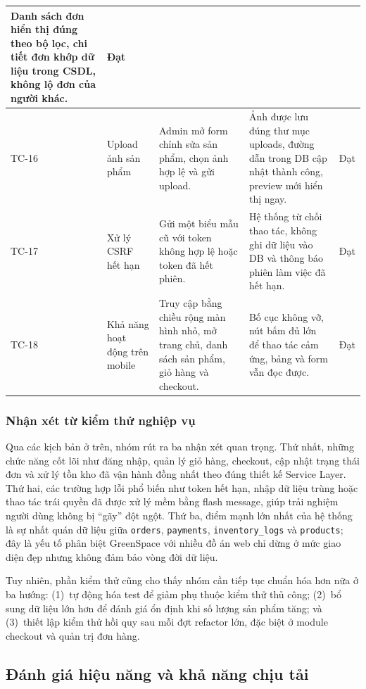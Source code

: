 \documentclass[11pt, a4paper]{article}
\begin{document}
\begin{longtable}{|p{1.2cm}|p{4.1cm}|p{4.9cm}|p{2.8cm}|p{2cm}|}
    Danh sách đơn hiển thị đúng theo bộ lọc, chi tiết đơn khớp dữ liệu trong CSDL, không lộ đơn của người khác. &
    Đạt \\ \hline
    TC-16 &
    Upload ảnh sản phẩm &
    Admin mở form chỉnh sửa sản phẩm, chọn ảnh hợp lệ và gửi upload. &
    Ảnh được lưu đúng thư mục uploads, đường dẫn trong DB cập nhật thành công, preview mới hiển thị ngay. &
    Đạt \\ \hline
    TC-17 &
    Xử lý CSRF hết hạn &
    Gửi một biểu mẫu cũ với token không hợp lệ hoặc token đã hết phiên. &
    Hệ thống từ chối thao tác, không ghi dữ liệu vào DB và thông báo phiên làm việc đã hết hạn. &
    Đạt \\ \hline
    TC-18 &
    Khả năng hoạt động trên mobile &
    Truy cập bằng chiều rộng màn hình nhỏ, mở trang chủ, danh sách sản phẩm, giỏ hàng và checkout. &
    Bố cục không vỡ, nút bấm đủ lớn để thao tác cảm ứng, bảng và form vẫn đọc được. &
    Đạt \\ \hline
\end{longtable}
\endgroup

\subsubsection{Nhận xét từ kiểm thử nghiệp vụ}

Qua các kịch bản ở trên, nhóm rút ra ba nhận xét quan trọng. Thứ nhất,
những chức năng cốt lõi như đăng nhập, quản lý giỏ hàng, checkout, cập nhật
trạng thái đơn và xử lý tồn kho đã vận hành đồng nhất theo đúng thiết kế
Service Layer. Thứ hai, các trường hợp lỗi phổ biến như token hết hạn, nhập
dữ liệu trùng hoặc thao tác trái quyền đã được xử lý mềm bằng flash message,
giúp trải nghiệm người dùng không bị ``gãy'' đột ngột. Thứ ba, điểm mạnh lớn
nhất của hệ thống là sự nhất quán dữ liệu giữa \texttt{orders},
\texttt{payments}, \texttt{inventory\_logs} và \texttt{products}; đây là yếu tố
phân biệt GreenSpace với nhiều đồ án web chỉ dừng ở mức giao diện đẹp nhưng
không đảm bảo vòng đời dữ liệu.

Tuy nhiên, phần kiểm thử cũng cho thấy nhóm cần tiếp tục chuẩn hóa hơn nữa
ở ba hướng: (1)~tự động hóa test để giảm phụ thuộc kiểm thử thủ công;
(2)~bổ sung dữ liệu lớn hơn để đánh giá ổn định khi số lượng sản phẩm tăng;
và (3)~thiết lập kiểm thử hồi quy sau mỗi đợt refactor lớn, đặc biệt ở
module checkout và quản trị đơn hàng.

\clearpage
\subsection{Đánh giá hiệu năng và khả năng chịu tải}
\end{document}
